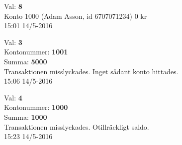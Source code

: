 \begin{multicols}{2}
\begin{exampleblock}
\end{exampleblock}
\begin{exampleblock}
Val: \textbf{8}\\
Konto 1000 (Adam Asson, id 6707071234) 0 kr\\
15:01 14/5-2016\\
\end{exampleblock}
\begin{exampleblock}
Val: \textbf{3}\\
Kontonummer: \textbf{1001}\\
Summa: \textbf{5000}\\
Transaktionen misslyckades. Inget sådant konto hittades.\\
15:06 14/5-2016\\
\end{exampleblock}
\begin{exampleblock}
Val: \textbf{4}\\
Kontonummer: \textbf{1000}\\
Summa: \textbf{1000}\\
Transaktionen misslyckades. Otillräckligt saldo.\\
15:23 14/5-2016\\
\end{exampleblock}

\end{multicols}
